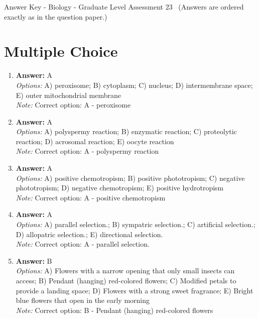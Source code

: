 \documentclass[12pt]{article}
\begin{document}
\begin{center}
Answer Key - Biology - Graduate Level Assessment 23 \
\small (Answers are ordered exactly as in the question paper.)
\end{center}

\section*{Multiple Choice}
\begin{enumerate}[label=\arabic*.]
\item \textbf{Answer:} A
\\ \textit{Options:} A) peroxisome; B) cytoplasm; C) nucleus; D) intermembrane space; E) outer mitochondrial membrane
\\ \textit{Note:} Correct option: A - peroxisome
\item \textbf{Answer:} A
\\ \textit{Options:} A) polyspermy reaction; B) enzymatic reaction; C) proteolytic reaction; D) acrosomal reaction; E) oocyte reaction
\\ \textit{Note:} Correct option: A - polyspermy reaction
\item \textbf{Answer:} A
\\ \textit{Options:} A) positive chemotropism; B) positive phototropism; C) negative phototropism; D) negative chemotropism; E) positive hydrotropism
\\ \textit{Note:} Correct option: A - positive chemotropism
\item \textbf{Answer:} A
\\ \textit{Options:} A) parallel selection.; B) sympatric selection.; C) artificial selection.; D) allopatric selection.; E) directional selection.
\\ \textit{Note:} Correct option: A - parallel selection.
\item \textbf{Answer:} B
\\ \textit{Options:} A) Flowers with a narrow opening that only small insects can access; B) Pendant (hanging) red-colored flowers; C) Modified petals to provide a landing space; D) Flowers with a strong sweet fragrance; E) Bright blue flowers that open in the early morning
\\ \textit{Note:} Correct option: B - Pendant (hanging) red-colored flowers
\end{enumerate}
\end{document}
